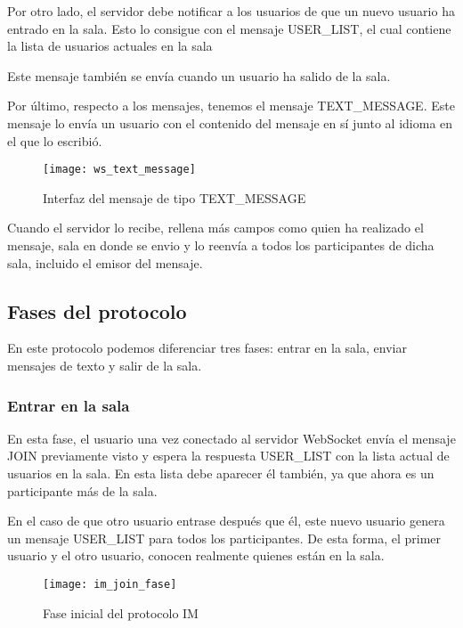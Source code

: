 Por otro lado, el servidor debe notificar a los usuarios de que un nuevo usuario ha entrado en la sala. Esto lo consigue con el mensaje USER\_LIST, el cual contiene la lista de usuarios actuales en la sala

Este mensaje también se envía cuando un usuario ha salido de la sala.

Por último, respecto a los mensajes, tenemos el mensaje TEXT\_MESSAGE. Este mensaje lo envía un usuario con el contenido del mensaje en sí junto al idioma en el que lo escribió.

\begin{figure}[htp!]
  \centering
  \texttt{[image: ws\_text\_message]}
  \caption{Interfaz del mensaje de tipo TEXT\_MESSAGE}
  \label{fig:ws_text_message}
\end{figure}

Cuando el servidor lo recibe, rellena más campos como quien ha realizado el mensaje, sala en donde se envio y lo reenvía a todos los participantes de dicha sala, incluido el emisor del mensaje.

\subsection{Fases del protocolo}

En este protocolo podemos diferenciar tres fases: entrar en la sala, enviar mensajes de texto y salir de la sala.

\subsubsection{Entrar en la sala}

En esta fase, el usuario una vez conectado al servidor WebSocket envía el mensaje JOIN previamente visto y espera la respuesta USER\_LIST con la lista actual de usuarios en la sala. En esta lista debe aparecer él también, ya que ahora es un participante más de la sala.

En el caso de que otro usuario entrase después que él, este nuevo usuario genera un mensaje USER\_LIST para todos los participantes. De esta forma, el primer usuario y el otro usuario, conocen realmente quienes están en la sala.

\begin{figure}[htp!]
  \centering
  \texttt{[image: im\_join\_fase]}
  \caption{Fase inicial del protocolo IM}
  \label{fig:im_join_fase}
\end{figure}

